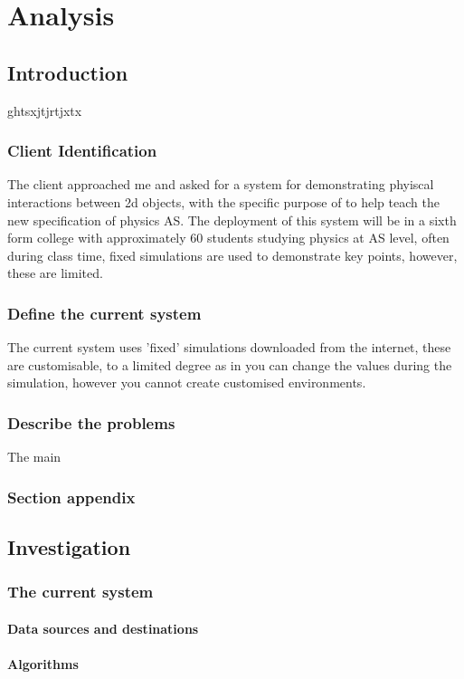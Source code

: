 \chapter{Analysis}

\section{Introduction}
ghtsxjtjrtjxtx
\subsection{Client Identification}
The client approached me and asked for a system for demonstrating phyiscal interactions between 2d objects, with the specific purpose of to help teach the new specification of physics AS. The deployment of this system will be in a sixth form college with approximately 60 students studying physics at AS level, often during class time, fixed simulations are used to demonstrate key points, however, these are limited.
\subsection{Define the current system}
The current system uses 'fixed' simulations downloaded from the internet, these are customisable, to a limited degree as in you can change the values during the simulation, however you cannot create customised environments.
\subsection{Describe the problems}
The main 
\subsection{Section appendix}

\section{Investigation}

\subsection{The current system}

\subsubsection{Data sources and destinations}

\subsubsection{Algorithms}

